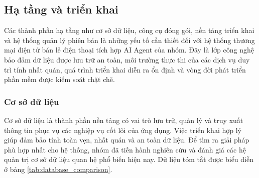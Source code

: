 \subsection{Hạ tầng và triển khai}

Các thành phần hạ tầng như cơ sở dữ liệu, công cụ đóng gói, nền tảng triển khai và hệ thống quản lý phiên bản là những yếu tố cần thiết đối với hệ thống thương mại điện tử bán lẻ điện thoại tích hợp AI Agent của nhóm. Đây là lớp công nghệ bảo đảm dữ liệu được lưu trữ an toàn, môi trường thực thi của các dịch vụ duy trì tính nhất quán, quá trình triển khai diễn ra ổn định và vòng đời phát triển phần mềm được kiểm soát chặt chẽ. 

\subsubsection{Cơ sở dữ liệu}

Cơ sở dữ liệu là thành phần nền tảng có vai trò lưu trữ, quản lý và truy xuất thông tin phục vụ các nghiệp vụ cốt lõi của ứng dụng. Việc triển khai hợp lý giúp đảm bảo tính toàn vẹn, nhất quán và an toàn dữ liệu. Để tìm ra giải pháp phù hợp nhất cho hệ thống, nhóm đã tiến hành nghiên cứu và đánh giá các hệ quản trị cơ sở dữ liệu quan hệ phổ biến hiện nay. Dữ liệu tóm tắt được biểu diễn ở bảng \ref{tab:database_comparison}.

